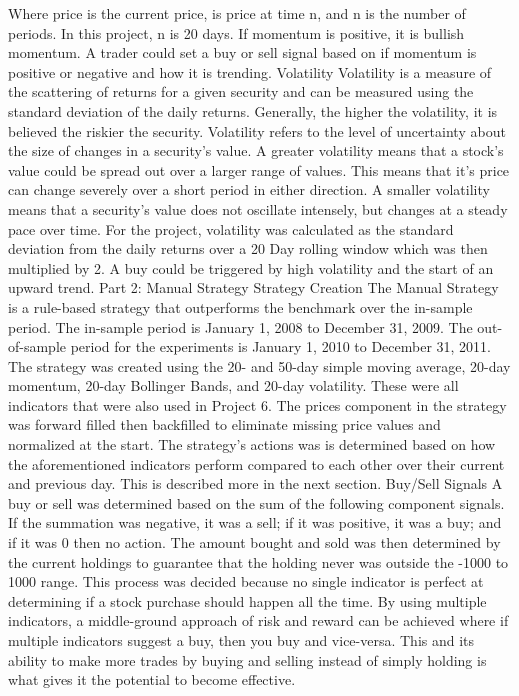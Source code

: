 \documentclass{article}
\begin{document}
Where price is the current price,  is price at time n, and n is the number of periods.
In this project, n is 20 days. If momentum is positive, it is bullish momentum. A trader could set a buy or sell signal based on if momentum is positive or negative and how it is trending.
Volatility
Volatility is a measure of the scattering of returns for a given security and can be measured using the standard deviation of the daily returns. Generally, the higher the volatility, it is believed the riskier the security. 
Volatility refers to the level of uncertainty about the size of changes in a security's value. A greater volatility means that a stock’s value could be spread out over a larger range of values. This means that it’s price can change severely over a short period in either direction. A smaller volatility means that a security's value does not oscillate intensely, but changes at a steady pace over time. 
For the project, volatility was calculated as the standard deviation from the daily returns over a 20 Day rolling window which was then multiplied by 2. A buy could be triggered by high volatility and the start of an upward trend.
Part 2: Manual Strategy
Strategy Creation
The Manual Strategy is a rule-based strategy that outperforms the benchmark over the in-sample period. The in-sample period is January 1, 2008 to December 31, 2009. The out-of-sample period for the experiments is January 1, 2010 to December 31, 2011.
The strategy was created using the 20- and 50-day simple moving average, 20-day momentum, 20-day Bollinger Bands, and 20-day volatility. These were all indicators that were also used in Project 6. The prices component in the strategy was forward filled then backfilled to eliminate missing price values and normalized at the start.
The strategy’s actions was is determined based on how the aforementioned indicators perform compared to each other over their current and previous day. This is described more in the next section.
Buy/Sell Signals
A buy or sell was determined based on the sum of the following component signals. If the summation was negative, it was a sell; if it was positive, it was a buy; and if it was 0 then no action. The amount bought and sold was then determined by the current holdings to guarantee that the holding never was outside the -1000 to 1000 range. This process was decided because no single indicator is perfect at determining if a stock purchase should happen all the time. By using multiple indicators, a middle-ground approach of risk and reward can be achieved where if multiple indicators suggest a buy, then you buy and vice-versa. This and its ability to make more trades by buying and selling instead of simply holding is what gives it the potential to become effective.
\end{document}
